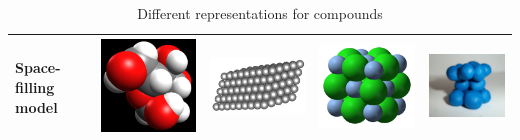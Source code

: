 \begin{table}[H]
\begin{center}
\begin{tabular}{|p{2cm}|l|l|l|l|}
\textbf{Space-filling model} & \includegraphics[width=.1\textwidth]{photos/glucose_spacefill.png}  & \includegraphics[width=.2\textwidth]{photos/graphite_spacefill.png} & \includegraphics[width=.1\textwidth]{photos/silverchloride_spacefill_wikipedia.png} & \includegraphics[width=.1\textwidth]{photos/zinc_spacefill.png} \\ \hline
  \end{tabular}
 \end{center}
\caption{Different representations for compounds}
\label{tab:atommodels}
\end{table}

